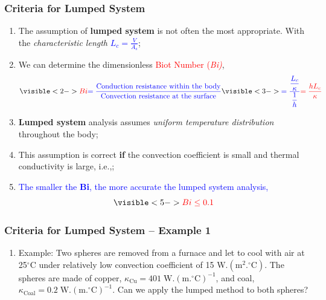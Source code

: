 \documentclass[10pt,compress]{beamer}
\newcommand{\frc}{\displaystyle\frac}
\newcommand{\red}{\textcolor{red}}
\newcommand{\blue}{\textcolor{blue}}
\begin{document}
\begin{frame}
 \frametitle{Criteria for Lumped System}
   \begin{enumerate}%
     \item<1-> The assumption of {\bf lumped system} is not often the most appropriate. With the {\it characteristic length} \blue{$L_{c}=\frc{V}{A_{s}}$};
     \item<2-> We can determine the dimensionless \red{Biot Number (\it{Bi})},
       \begin{equation}
          \visible<2->{\red{Bi} \blue{= \frc{\text{Conduction resistance within the body}}{\text{Convection resistance at the surface}}}} \visible<3->{\blue{= \frc{\frc{L_{c}}{\kappa}}{\frc{1}{h}}} \red{= \frc{h L_{c}}{\kappa}}}
       \end{equation}  
     \item<4-> {\bf Lumped system} analysis assumes {\it uniform temperature distribution} throughout the body;
     \item<4-> This assumption is correct {\bf if} the convection coefficient is small and thermal conductivity is large, i.e.,;
     \item<5-> \blue{The smaller the {\bf Bi}, the more accurate the lumped system analysis,} 
                     \begin{displaymath}
                       \visible<5->{ \red{Bi \leq 0.1}}
                     \end{displaymath}
   \end{enumerate}
\end{frame}

\begin{frame}
 \frametitle{Criteria for Lumped System -- Example 1}
   \begin{enumerate}%
     \item<1-> Example: Two spheres are removed from a furnace and let to cool with air at 25$^{\circ}$C under relatively low convection coefficient of 15 W.$\left(\text{m}^{2}.^{\circ}\text{C}\right)$. The spheres are made of copper,  $\kappa_{\text{Cu}}=401\;\text{W.}\left(\text{m.}^{\circ}\text{C}\right)^{-1}$, and coal, $\kappa_{\text{Coal}}=0.2\;\text{W.}\left(\text{m.}^{\circ}\text{C}\right)^{-1}$. Can we apply the lumped method to both spheres? 
   \end{enumerate}
\end{frame}
\end{document}
